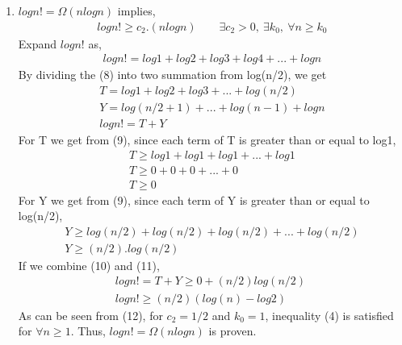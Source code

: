 \documentclass[11pt]{article}
\begin{document}
\begin{enumerate}
\begin{enumerate}
	 
	 
	 \item
	 $ logn! = \Omega(nlogn)$ implies,
	 \begin{equation}
	 \begin{split}
	 logn! \geq c_2.(nlogn)   \quad \quad \exists c_2>0,\ \exists k_0, \ \forall n \geq k_0
	 \end{split}
	 \end{equation}
	  Expand $logn!$ as,
	 \begin{equation}
	 \begin{split}
	 logn! = log1 + log2 + log3 + log4 + ... + logn
	 \end{split}
	 \end{equation}
	 By dividing the (8) into two summation from log(n/2), we get
	 \begin{equation}
	 \begin{split}
	 T = log1 + log2 + log3 + ... + log(n/2)\\
	 Y = log(n/2+1) + ... + log(n-1) + logn\\
	 logn! = T + Y \qquad \qquad \qquad
	 \end{split}
	 \end{equation}
	 For T we get from (9), since each term of T is greater than or equal to log1,
	 \begin{equation}
	 \begin{split}
	 T \geq log1 + log1 + log1 + ... + log1 \\
	 T \geq 0 + 0 + 0 + ... + 0 \qquad \\
	 T \geq 0 \qquad \qquad \qquad 
	 \end{split}
	 \end{equation} 
	 For Y we get from (9), since each term of Y is greater than or equal to log(n/2),
	 \begin{equation}
	 \begin{split}
	 Y \geq log(n/2) + log(n/2) + log(n/2) + ... + log(n/2) \\
	 Y \geq (n/2).log(n/2) \qquad \qquad \qquad
	 \end{split}
	 \end{equation} 
	 If we combine (10) and (11),
	 \begin{equation}
	 \begin{split}
	 logn! = T + Y \geq 0 + (n/2)log(n/2)\\
	 logn! \geq (n/2)(log(n) - log2) \qquad 
	 \end{split}
	 \end{equation} 
	 As can be seen from (12), for $c_2 = 1/2$ and $k_0 = 1$,  inequality (4) is satisfied for $\forall n \geq 1$. Thus, $ logn! = \Omega(nlogn)$ is proven.\\
	 \end{enumerate}
 

\end{enumerate}
\end{document}
